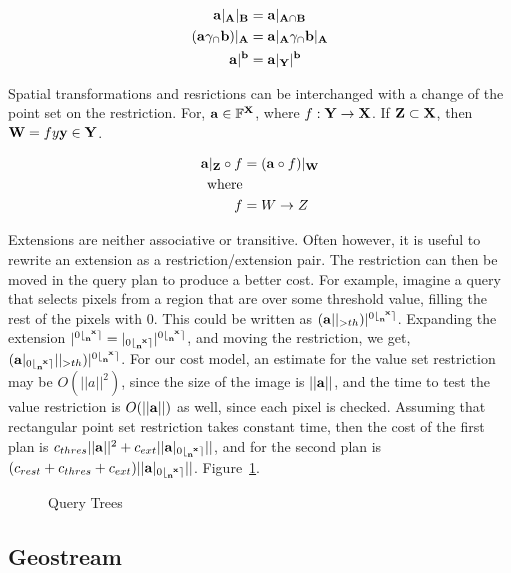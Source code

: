 \documentclass{vldb}
\begin{document}
\begin{align}
{\ensuremath{\bf{a}}}|_{\bf{A}}|_{\bf{B}} &= {\bf{a}}|_{{\bf{A}}\cap{\ensuremath{\bf{B}}}} \\
({\bf{a}} \gamma_\cap {\ensuremath{\bf{b}}})|_{\bf{A}} &= {\bf{a}}|_{\bf{A}} \gamma_\cap {\ensuremath{\bf{b}}}|_{\bf{A}} \\
{\bf{a}}|^{\bf{b}} &= {\bf{a}}|_{\bf{Y}}|^{\bf{b}}
\end{align}

Spatial transformations and resrictions can be interchanged with a
change of the point set on the restriction.  For, ${\bf{a}} \in
{\ensuremath{\mathbb{F}}}^{{\bf{X}}}$, where $f: {\bf{Y}} \rightarrow {\ensuremath{\bf{X}}}$.  If ${\bf{Z}}
\subset {\ensuremath{\bf{X}}}$, then ${\bf{W}} = f{y} {\bf{y}} \in {\ensuremath{\bf{Y}}}$.

\begin{align}
  {\ensuremath{\bf{a}}}|_{\bf{Z}} \circ f &= ({\bf{a}} \circ f)|_{{\bf{W}}} \\
  \text{where} \\
  f &= W \rightarrow Z
\end{align}

Extensions are neither associative or transitive.  Often however, it
is useful to rewrite an extension as a restriction/extension pair.
The restriction can then be moved in the query plan to produce a
better cost.  For example, imagine a query that selects pixels from a
region that are over some threshold value, filling the rest of the
pixels with 0.  This could be written as
$({\bf{a}}||_{>th})|^{0\lfloor_{{\bf{n}}}^{\;\;{\bf{x}}}\rceil}$.  Expanding the extension
$|^{0\lfloor_{{\bf{n}}}^{\;\;{\bf{x}}}\rceil}=|_{0\lfloor_{{\bf{n}}}^{\;\;{\bf{x}}}\rceil}|^{0\lfloor_{{\bf{n}}}^{\;\;{\bf{x}}}\rceil}$, and moving the restriction,
we get, $({\bf{a}}|_{0\lfloor_{{\bf{n}}}^{\;\;{\bf{x}}}\rceil}||_{>th})|^{0\lfloor_{{\bf{n}}}^{\;\;{\bf{x}}}\rceil}$.  For our cost
model, an estimate for the value set restriction may be $O(||a||^2)$,
since the size of the image is $||{\bf{a}}||$, and the time to test the
value restriction is $O(||{\bf{a}}||)$ as well, since each pixel is
checked.  Assuming that rectangular point set restriction takes
constant time, then the cost of the first plan is
$c_{thres}||{\bf{a}}||^2+c_{ext}||{\bf{a}}|_{0\lfloor_{{\bf{n}}}^{\;\;{\bf{x}}}\rceil}||$, and for the
second plan is $(c_{rest}+c_{thres}+c_{ext})||{\bf{a}}|_{0\lfloor_{{\bf{n}}}^{\;\;{\bf{x}}}\rceil}||$.
Figure~\ref{fig:extension}.

\begin{figure}[htbp]
  \centering
  \caption{Query Trees}
  \label{fig:extension}
\end{figure}

\subsection{Geostream}
\end{document}
